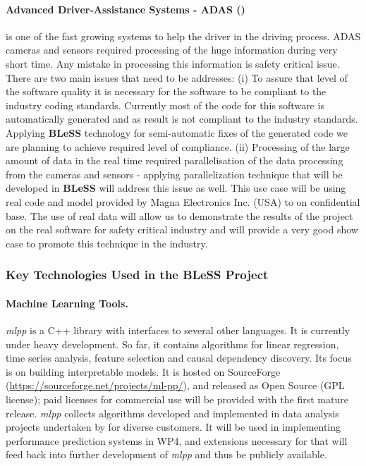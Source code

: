 \documentclass[a4paper,11pt]{article}
\newcommand{\project}[1]{\textbf{#1}\xspace}
\newcommand{\BLESS}{\project{BLeSS}}
\newcommand{\TheProject}{\BLESS}
\begin{document}
\paragraph{Advanced Driver-Assistance Systems - ADAS (\PRshort)}is one of the fast growing systems to help the driver in the driving process. ADAS cameras and sensors required processing of the huge information during very short time. Any mistake in processing this information is safety critical issue. There are two main issues that need to be addresses: (i) To assure that level of the software quality it is necessary for the software to be compliant to the industry coding standards. Currently most of the code for this software is automatically generated and as result is not compliant to the industry standards. Applying \TheProject technology for semi-automatic fixes of the generated code we are planning to achieve required level of compliance. (ii) Processing of the large amount of data in the real time required parallelisation of the data processing from the cameras and sensors - applying parallelization technique that will be developed in \TheProject will address this issue as well. 
This use case will be using real code and model provided by Magna Electronics Inc. (USA) to \PRshort on confidential base. The use of real data will allow us to demonstrate the results of the project on the real software for safety critical industry and will provide a very good show case to promote this technique in the industry.

\subsubsection{Key Technologies Used in the \TheProject{} Project}
\label{sect:key-technologies}

\paragraph{\SCCHshort{} Machine Learning Tools.}
\label{sec:mlpp}
\emph{mlpp} is a C++ library with interfaces to several other languages. It 
is currently under heavy development. So far, it contains algorithms for 
linear regression, time series analysis, feature selection and causal 
dependency discovery. Its focus is on building interpretable models. It is hosted 
on SourceForge (\url{https://sourceforge.net/projects/ml-pp/}), and released 
as Open Source (GPL license); paid licenses for commercial use will be provided
with the first mature release.
%
\emph{mlpp} collects algorithms developed and implemented in data analysis 
projects undertaken by \SCCHshort{} for diverse customers. It will be used
in implementing performance prediction systems in WP4, and extensions necessary
for that will feed back into further development of \emph{mlpp} and thus be
publicly available.
\end{document}
